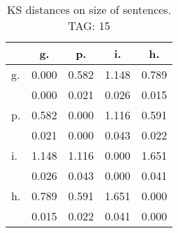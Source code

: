 \begin{table}[h!]
\begin{center}
\begin{tabular}{| l | c | c | c | c |}\hline
 & g. & p. & i. & h. \\\hline
g. & 0.000  & 0.582  & 1.148  & 0.789 \\\hline
 & 0.000  & 0.021  & 0.026  & 0.015 \\\hline
p. & 0.582  & 0.000  & 1.116  & 0.591 \\\hline
 & 0.021  & 0.000  & 0.043  & 0.022 \\\hline
i. & 1.148  & 1.116  & 0.000  & 1.651 \\\hline
 & 0.026  & 0.043  & 0.000  & 0.041 \\\hline
h. & 0.789  & 0.591  & 1.651  & 0.000 \\\hline
 & 0.015  & 0.022  & 0.041  & 0.000 \\\hline
\end{tabular}
\caption{KS distances on size of sentences. TAG: 15}
\end{center}
\end{table}